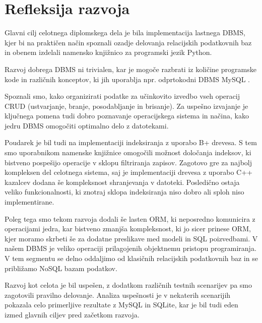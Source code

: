\documentclass[a4paper,12pt,openright]{book}
\begin{document}
    \section{Refleksija razvoja}
    \label{refleksija}

    Glavni cilj celotnega diplomskega dela je bila implementacija lastnega DBMS, kjer bi na praktičen način spoznali ozadje delovanja relacijskih podatkovnih baz in obenem izdelali namensko knjižnico za programski jezik Python.

    Razvoj dobrega DBMS ni trivialen, kar je mogoče razbrati iz količine programske kode in različnih konceptov, ki jih uporablja npr. odprtokodni DBMS MySQL \cite{MYSQL_GITHUB}.
    
    Spoznali smo, kako organizirati podatke za učinkovito izvedbo vseh operacij CRUD (ustvarjanje, branje, posodabljanje in brisanje). Za uspešno izvajanje je ključnega pomena tudi dobro poznavanje operacijskega sistema in načina, kako jedru DBMS omogočiti optimalno delo z datotekami.
    
     Poudarek je bil tudi na implementaciji indeksiranja z uporabo B+ drevesa. S tem smo uporabnikom namenske knjižnice omogočili možnost določanja indeksov, ki bistveno pospešijo operacije v sklopu filtriranja zapisov. Zagotovo gre za najbolj kompleksen del celotnega sistema, saj je implementaciji drevesa z uporabo C++ kazalcev dodana še kompleksnost shranjevanja v datoteki. Posledično ostaja veliko funkcionalnosti, ki znotraj sklopa indeksiranja niso dobro ali sploh niso implementirane.
    
    Poleg tega smo tekom razvoja dodali še lasten ORM, ki neposredno komunicira z operacijami jedra, kar bistveno zmanjša kompleksnost, ki jo sicer prinese ORM, kjer moramo skrbeti še za dodatne preslikave med modeli in SQL poizvedbami. V našem DBMS je veliko operaciji prilagojenih objektnemu pristopu programiranja. V tem segmentu se delno oddaljimo od klasičnih relacijskih podatkovnih baz in se približamo NoSQL bazam podatkov.
    
    Razvoj kot celota je bil uspešen, z dodatkom različnih testnih scenarijev pa smo zagotovili pravilno delovanje. Analiza uspešnosti je v nekaterih scenarijih pokazala celo primerljive rezultate z MySQL in SQLite, kar je bil tudi eden izmed glavnih ciljev pred začetkom razvoja.


\raggedright

\printbibliography[heading=bibintoc,title={Literatura}]
\end{document}
